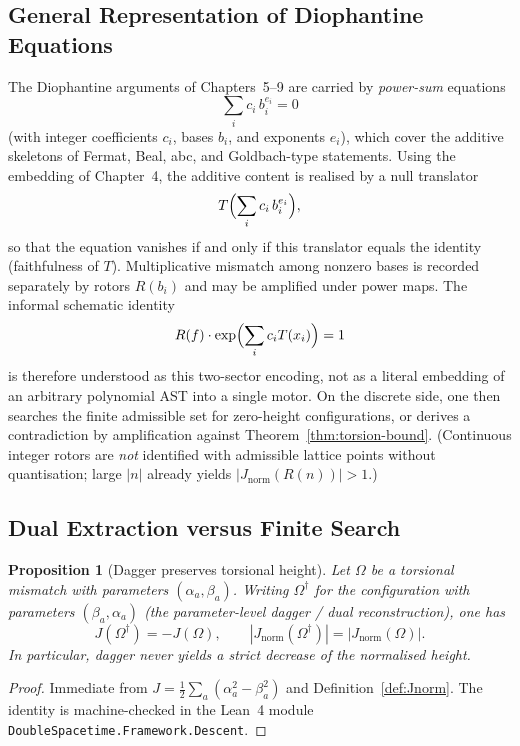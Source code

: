 \documentclass[a4paper]{article}
\newtheorem{proposition}[theorem]{Proposition}
\theoremstyle{definition}
\theoremstyle{remark}
\newcommand{\Jnorm}{J_{\mathrm{norm}}}
\begin{document}
\subsection{General Representation of Diophantine Equations}

The Diophantine arguments of Chapters~5--9 are carried by \emph{power-sum} equations
\[
\sum_i c_i\, b_i^{e_i}=0
\]
(with integer coefficients \(c_i\), bases \(b_i\), and exponents \(e_i\)), which cover the additive skeletons of Fermat, Beal, abc, and Goldbach-type statements. Using the embedding of Chapter~4, the additive content is realised by a null translator
\[
T\Bigl(\sum_i c_i\, b_i^{e_i}\Bigr),
\]
so that the equation vanishes if and only if this translator equals the identity (faithfulness of \(T\)). Multiplicative mismatch among nonzero bases is recorded separately by rotors \(R(b_i)\) and may be amplified under power maps. The informal schematic identity
\[
R(f) \cdot \exp\Bigl( \sum_i c_i T(x_i) \Bigr) = 1
\]
is therefore understood as this two-sector encoding, not as a literal embedding of an arbitrary polynomial AST into a single motor. On the discrete side, one then searches the finite admissible set for zero-height configurations, or derives a contradiction by amplification against Theorem~\ref{thm:torsion-bound}. (Continuous integer rotors are \emph{not} identified with admissible lattice points without quantisation; large \(|n|\) already yields \(|\Jnorm(R(n))|>1\).)

\subsection{Dual Extraction versus Finite Search}
\label{sec:unified-descent}

\begin{proposition}[Dagger preserves torsional height]
\label{prop:dagger-height}
Let \(\Omega\) be a torsional mismatch with parameters \((\alpha_a,\beta_a)\). Writing \(\Omega^\dagger\) for the configuration with parameters \((\beta_a,\alpha_a)\) (the parameter-level dagger / dual reconstruction), one has
\[
J(\Omega^\dagger)=-J(\Omega),\qquad |\Jnorm(\Omega^\dagger)|=|\Jnorm(\Omega)|.
\]
In particular, dagger never yields a strict decrease of the normalised height.
\end{proposition}

\begin{proof}
Immediate from \(J=\frac12\sum_a(\alpha_a^2-\beta_a^2)\) and Definition~\ref{def:Jnorm}. The identity is machine-checked in the Lean~4 module \texttt{DoubleSpacetime.\allowbreak Framework.\allowbreak Descent}.
\end{proof}
\end{document}
